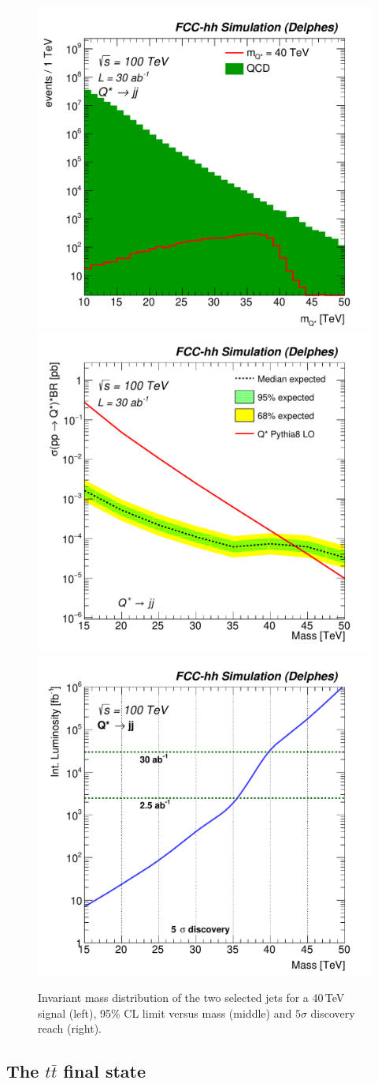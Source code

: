 \documentclass[a4paper,11pt]{article}
\newcommand*{\ttbar}{\ensuremath{t\bar{t}}}
\begin{document}
\begin{figure}[!htb]
  \centering
  \includegraphics[width=0.32\columnwidth]{Fig/Mj1j2_pf04_sel1_nostack_log-eps-converted-to.pdf}
  \includegraphics[width=0.32\columnwidth]{Fig/lim_Qstar_jj_fcc_v02-eps-converted-to.pdf}
  \includegraphics[width=0.32\columnwidth]{Fig/DiscoveryPotential_jj_rootStyle-eps-converted-to.pdf}
   \caption{Invariant mass distribution of the two selected jets for a 40\,TeV signal (left), 95\% CL limit versus mass (middle) and $5\sigma$ discovery reach (right).}
  \label{figure:hadronicresonances:jj}
\end{figure}

\subsection{The \texorpdfstring{\ttbar}{tt} final state}
\label{sec:hadtt}
\end{document}
